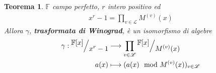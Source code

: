 \documentclass[mathserif]{beamer}
\def\quotient#1#2{%
   \raise1ex\hbox{$#1$}\Big/\lower1ex\hbox{$#2$}%
}
\newtheorem{teorema}{Teorema}
\begin{document}


\begin{frame}
      \begin{teorema}
        $\mathbb{F}$ campo perfetto, $r$ intero positivo ed 
	\begin{align*}
	      x^r-1 = \prod_{v\in \mathscr{L}} M^{(v)}(x) 
	\end{align*}
       Allora $\gamma$, {\bf trasformata di Winograd},  è un isomorfismo di algebre
	\begin{align*}
	\gamma :  \quotient{\mathbb{F} \lbrack x \rbrack  }{x^{r} - 1}  
		  & \longrightarrow  
		  \prod_{v\in \mathscr{L}} \quotient{\mathbb{F} \lbrack x \rbrack  }{M^{(v)}(x)}   \\
		  a(x) &\longmapsto  ( a(x)\mod{M^{(v)}(x)})_{v\in \mathscr{L}}
	\end{align*}
      \end{teorema}
\end{frame}
\end{document}
